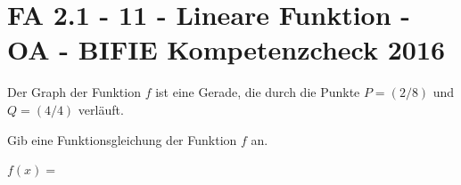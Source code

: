 \section{FA 2.1 - 11 - Lineare Funktion - OA - BIFIE Kompetenzcheck 2016}

\begin{beispiel}[FA 1.5]{1} %
				Der Graph der Funktion $f$ ist eine Gerade, die durch die Punkte $P=(2/8)$ und $Q=(4/4)$ verläuft.

Gib eine Funktionsgleichung der Funktion $f$ an.

$f(x)=$\,
\end{beispiel}	